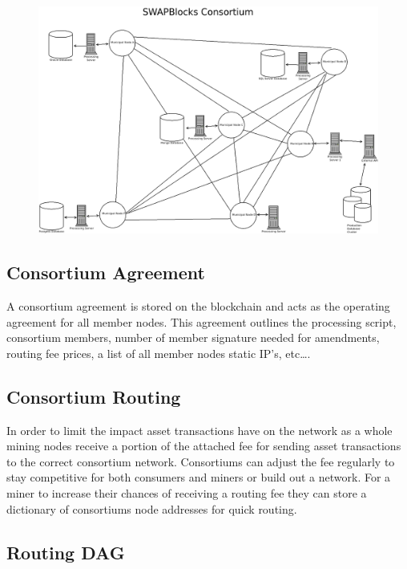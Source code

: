 \documentclass[12pt]{article}
\begin{document}
\begin{figure}[h]
	\centering
	\includegraphics[width=.85\textwidth]{consortium}
	\label{fig:nodespace1}
\end{figure}


\subsection{Consortium Agreement}

A consortium agreement is stored 
on the blockchain and acts as the operating agreement for all member nodes. 
This agreement outlines the processing script, consortium 
members, number of member signature needed for amendments, routing fee prices, a 
list of all member nodes static IP’s, etc….

\subsection{Consortium Routing}


In order to limit the impact asset transactions have on the network as a whole mining 
nodes receive a portion of the attached fee for sending asset transactions to the correct
consortium network.  Consortiums can adjust the fee regularly to stay competitive for both
consumers and miners or build out a network. 
For a miner to 
increase their chances of receiving a routing fee they can store a dictionary 
of consortiums node addresses for quick routing.



\subsection{Routing DAG}
\end{document}
